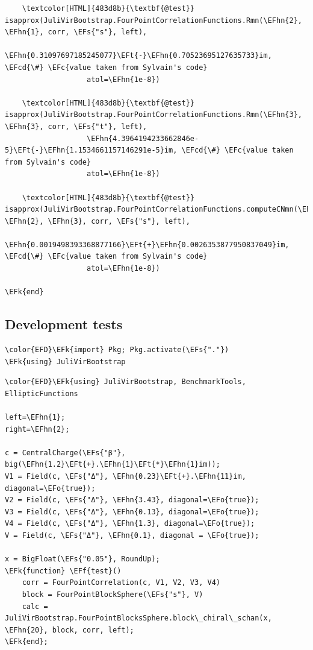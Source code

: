 \documentclass[a4paper]{article}
\numberwithin{equation}{section}
\newcommand{\EFc}[1]{\textcolor{EFc}{#1}} %
\newcommand{\EFcd}[1]{\textcolor{EFcd}{#1}} %
\newcommand{\EFs}[1]{\textcolor{EFs}{#1}} %
\newcommand{\EFk}[1]{\textcolor{EFk}{#1}} %
\newcommand{\EFf}[1]{\textcolor{EFf}{#1}} %
\newcommand{\EFt}[1]{\textcolor{EFt}{#1}} %
\newcommand{\EFo}[1]{\textcolor{EFo}{#1}} %
\newcommand{\EFhn}[1]{\textcolor{EFhn}{#1}} %
\begin{document}
\begin{Code}
\begin{Verbatim}
    \textcolor[HTML]{483d8b}{\textbf{@test}} isapprox(JuliVirBootstrap.FourPointCorrelationFunctions.Rmn(\EFhn{2}, \EFhn{1}, corr, \EFs{"s"}, left),
                   \EFhn{0.31097697185245077}\EFt{-}\EFhn{0.70523695127635733}im, \EFcd{\#} \EFc{value taken from Sylvain's code}
                   atol=\EFhn{1e-8})

    \textcolor[HTML]{483d8b}{\textbf{@test}} isapprox(JuliVirBootstrap.FourPointCorrelationFunctions.Rmn(\EFhn{3}, \EFhn{3}, corr, \EFs{"t"}, left),
                   \EFhn{4.3964194233662846e-5}\EFt{-}\EFhn{1.1534661157146291e-5}im, \EFcd{\#} \EFc{value taken from Sylvain's code}
                   atol=\EFhn{1e-8})

    \textcolor[HTML]{483d8b}{\textbf{@test}} isapprox(JuliVirBootstrap.FourPointCorrelationFunctions.computeCNmn(\EFhn{7}, \EFhn{2}, \EFhn{3}, corr, \EFs{"s"}, left),
                   \EFhn{0.0019498393368877166}\EFt{+}\EFhn{0.0026353877950837049}im, \EFcd{\#} \EFc{value taken from Sylvain's code}
                   atol=\EFhn{1e-8})

\EFk{end}
\end{Verbatim}
\end{Code}
\subsection{Development tests}
\label{sec:orgbba3106}
\begin{Code}
\begin{Verbatim}
\color{EFD}\EFk{import} Pkg; Pkg.activate(\EFs{"."})
\EFk{using} JuliVirBootstrap
\end{Verbatim}
\end{Code}

\begin{Code}
\begin{Verbatim}
\color{EFD}\EFk{using} JuliVirBootstrap, BenchmarkTools, EllipticFunctions

left=\EFhn{1};
right=\EFhn{2};

c = CentralCharge(\EFs{"β"}, big(\EFhn{1.2}\EFt{+}.\EFhn{1}\EFt{*}\EFhn{1}im));
V1 = Field(c, \EFs{"Δ"}, \EFhn{0.23}\EFt{+}.\EFhn{11}im, diagonal=\EFo{true});
V2 = Field(c, \EFs{"Δ"}, \EFhn{3.43}, diagonal=\EFo{true});
V3 = Field(c, \EFs{"Δ"}, \EFhn{0.13}, diagonal=\EFo{true});
V4 = Field(c, \EFs{"Δ"}, \EFhn{1.3}, diagonal=\EFo{true});
V = Field(c, \EFs{"Δ"}, \EFhn{0.1}, diagonal = \EFo{true});

x = BigFloat(\EFs{"0.05"}, RoundUp);
\EFk{function} \EFf{test}()
    corr = FourPointCorrelation(c, V1, V2, V3, V4)
    block = FourPointBlockSphere(\EFs{"s"}, V)
    calc = JuliVirBootstrap.FourPointBlocksSphere.block\_chiral\_schan(x, \EFhn{20}, block, corr, left);
\EFk{end};
\end{Verbatim}
\end{Code}
\end{document}
